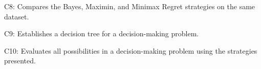 

	
	\begin{ExamCriteria}
		\item C8: Compares the Bayes, Maximin, and Minimax Regret strategies on the same dataset.
		\item C9: Establishes a decision tree for a decision-making problem.
		\item C10: Evaluates all possibilities in a decision-making problem using the strategies presented.
	\end{ExamCriteria}

